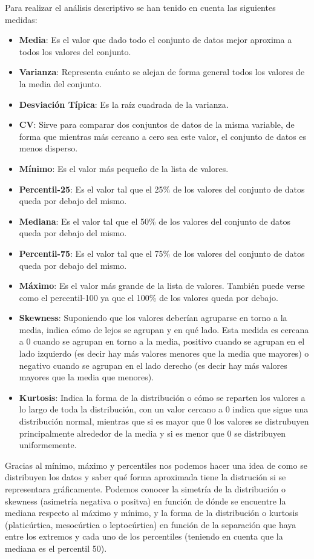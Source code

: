 \documentclass{article}
\begin{document}
Para realizar el análisis descriptivo se han tenido en cuenta las siguientes medidas:
\begin{itemize}
\item \textbf{Media}: Es el valor que dado todo el conjunto de datos mejor aproxima a todos los valores del conjunto.
\item \textbf{Varianza}: Representa cuánto se alejan de forma general todos los valores de la media del conjunto.
\item \textbf{Desviación Típica}: Es la raíz cuadrada de la varianza.
\item \textbf{CV}: Sirve para comparar dos conjuntos de datos de la misma variable, de forma que mientras más cercano a cero sea este valor, el conjunto de datos es menos disperso. 
\item \textbf{Mínimo}: Es el valor más pequeño de la lista de valores.
\item \textbf{Percentil-25}: Es el valor tal que el 25\% de los valores del conjunto de datos queda por debajo del mismo.
\item \textbf{Mediana}: Es el valor tal que el 50\% de los valores del conjunto de datos queda por debajo del mismo.
\item \textbf{Percentil-75}: Es el valor tal que el 75\% de los valores del conjunto de datos queda por debajo del mismo.
\item \textbf{Máximo}: Es el valor más grande de la lista de valores. También puede verse como el percentil-100 ya que el 100\% de los valores queda por debajo.
\item \textbf{Skewness}: Suponiendo que los valores deberían agruparse en torno a la media, indica cómo de lejos se agrupan y en qué lado. Esta medida es cercana a 0 cuando se agrupan en torno a la media, positivo cuando se agrupan en el lado izquierdo (es decir hay más valores menores que la media que mayores) o negativo cuando se agrupan en el lado derecho (es decir hay más valores mayores que la media que menores). 
\item \textbf{Kurtosis}: Indica la forma de la distribución o cómo se reparten los valores a lo largo de toda la distribución, con un valor cercano a 0 indica que sigue una distribución normal, mientras que si es mayor que 0 los valores se distrubuyen principalmente alrededor de la media y si es menor que 0 se distribuyen uniformemente.
\end{itemize}

Gracias al mínimo, máximo y percentiles nos podemos hacer una idea de como se distribuyen los datos y saber qué forma aproximada tiene la distrución si se representara gráficamente. Podemos conocer la simetría de la distribución o skewness (asimetría negativa o positva) en función de dónde se encuentre la mediana respecto al máximo y mínimo, y la forma de la distribución o kurtosis (platicúrtica, mesocúrtica o leptocúrtica) en función de la separación que haya entre los extremos y cada uno de los percentiles (teniendo en cuenta que la mediana es el percentil 50).
\end{document}
